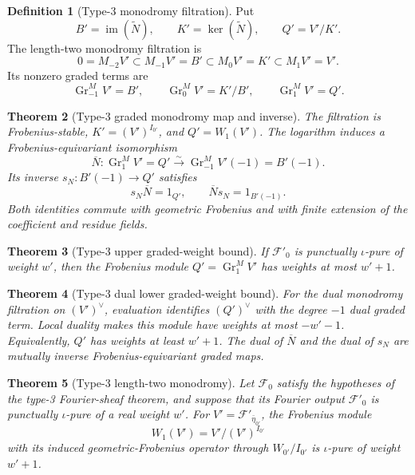 \documentclass[10pt]{article}
\newtheorem{theorem}{Theorem}[section]
\theoremstyle{definition}
\newtheorem{definition}[theorem]{Definition}
\begin{document}
\begin{definition}[Type-3 monodromy filtration]
Put
\[
 B'=\operatorname{im}(\widetilde N),\qquad
 K'=\ker(\widetilde N),\qquad
 Q'=V'/K'.
\]
The length-two monodromy filtration is
\[
 0=M_{-2}V'\subset M_{-1}V'=B'
 \subset M_0V'=K'\subset M_1V'=V'.
\]
Its nonzero graded terms are
\[
 \operatorname{Gr}_{-1}^MV'=B',\qquad
 \operatorname{Gr}_{0}^MV'=K'/B',\qquad
 \operatorname{Gr}_{1}^MV'=Q'.
\]
\end{definition}

\begin{theorem}[Type-3 graded monodromy map and inverse]
The filtration is Frobenius-stable,
\(K'=(V')^{I_{0'}}\), and \(Q'=W_1(V')\).  The logarithm induces a
Frobenius-equivariant isomorphism
\[
 \overline N:\operatorname{Gr}_{1}^MV'=Q'
       \xrightarrow{\sim}\operatorname{Gr}_{-1}^MV'(-1)=B'(-1).
\]
Its inverse \(s_N:B'(-1)\to Q'\) satisfies
\[
 s_N\overline N=1_{Q'},\qquad
 \overline Ns_N=1_{B'(-1)}.
\]
Both identities commute with geometric Frobenius and with finite extension
of the coefficient and residue fields.
\end{theorem}

\begin{theorem}[Type-3 upper graded-weight bound]
If \(\mathcal F'_0\) is punctually \(\iota\)-pure of weight \(w'\), then
the Frobenius module \(Q'=\operatorname{Gr}_{1}^MV'\) has weights at most
\(w'+1\).
\end{theorem}

\begin{theorem}[Type-3 dual lower graded-weight bound]
For the dual monodromy filtration on \((V')^\vee\), evaluation identifies
\((Q')^\vee\) with the degree \(-1\) dual graded term.  Local duality makes
this module have weights at most \(-w'-1\).  Equivalently, \(Q'\) has
weights at least \(w'+1\).  The dual of \(\overline N\) and the dual of
\(s_N\) are mutually inverse Frobenius-equivariant graded maps.
\end{theorem}

\begin{theorem}[Type-3 length-two monodromy]
Let \(\mathcal F_0\) satisfy the hypotheses of the type-3 Fourier-sheaf
theorem, and suppose that its Fourier output \(\mathcal F'_0\) is punctually
\(\iota\)-pure of a real weight \(w'\).  For
\(V'=\mathcal F'_{\bar\eta_{0'}}\), the Frobenius module
\[
                         W_1(V')=V'/(V')^{I_{0'}}
\]
with its induced geometric-Frobenius operator through
\(W_{0'}/I_{0'}\) is \(\iota\)-pure of weight \(w'+1\).
\end{theorem}
\end{document}
